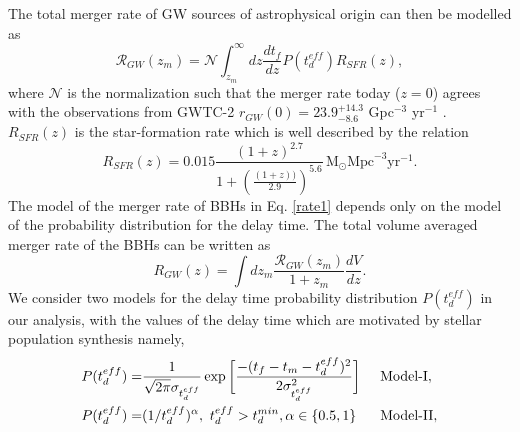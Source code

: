 \documentclass[a4paper,useAMS,usenatbib]{mnras}
\begin{document}
The total merger rate of GW sources of astrophysical origin  can then be modelled as 
\begin{equation}\label{rate1}
    \mathcal{R}_{GW}(z_m)= \mathcal{N}\int^{\infty}_{z_m} dz \frac{dt_f}{dz}P(t^{eff}_d) R_{SFR}(z),
\end{equation}
where $\mathcal N$ is the normalization such that the merger rate today ($z=0$) agrees with the observations from GWTC-2 $r_{GW}(0)= 23.9^{+14.3}_{-8.6}$ Gpc$^{-3}$ yr$^{-1}$ \citep{Abbott_2020}. $R_{SFR}(z)$ is the star-formation rate which is well described  by the \citep{Madau:2014bja} relation
\begin{equation}\label{mdsfr}
R_{SFR}(z)= 0.015 \frac{(1+z)^{2.7}}{1+ (\frac{(1+z))}{2.9})^{5.6}} \, \text{M}_\odot \text{Mpc}^{-3} \text{yr}^{-1}.
\end{equation}
The model of the merger rate of BBHs in Eq. \eqref{rate1} depends only on the model of the probability distribution for the delay time. The total volume averaged  merger rate of the BBHs can be written as 
\begin{equation}\label{rate2}
    R_{GW}(z)= \int d z_m \frac{ \mathcal{R}_{GW}(z_m)}{1+z_m} \frac{dV}{dz}.
\end{equation}
We consider two models for the delay time probability distribution $ P(t^{eff}_d)$ in our analysis, with the values of the delay time which are motivated by stellar population synthesis namely, 
{\begin{align}\label{ptdop}
\begin{split}
   P(t^{eff}_d)=&  \frac{1}{\sqrt{2\pi}\sigma_{t^{eff}_d}}\exp{\bigg[\frac{-(t_f-t_m-t^{eff}_d)^2}{2\sigma^2_{t^{eff}_d}}\bigg]}\hspace{0.5cm} \text{Model-I},\\
   P(t^{eff}_d)=& (1/{t^{eff}_d})^\alpha, \,\, t^{eff}_d > t^{min}_d, \alpha \in\{0.5, 1\} \hspace{0.6cm} \text{Model-II},\\
\end{split}
\end{align}}
\end{document}
